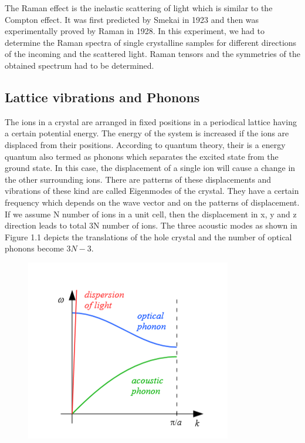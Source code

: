 \documentclass[openany,11pt,a4paper]{report}
\begin{document}
The Raman effect is the inelastic scattering of light which is similar to the Compton effect. It was first predicted by Smekai in 1923 and then was experimentally proved by Raman in 1928. In this experiment, we had to determine the Raman spectra of single crystalline samples for different directions of the incoming and the scattered light. Raman tensors and the symmetries of the obtained spectrum had to be determined. \cite{bib1}

\subsection*{Lattice vibrations and Phonons}

The ions in a crystal are arranged in  fixed positions in a periodical lattice having a certain potential energy. The energy of the system is increased if the ions are displaced from their positions. According to quantum theory, their is a energy quantum also termed as phonons which separates the excited state from the ground state.  In this case, the displacement of a single ion will cause a change in the other surrounding ions. There are patterns of these displacements and vibrations of these kind are called Eigenmodes of the crystal. They have a certain frequency which depends on the wave vector and on the patterns of displacement.
If we assume N number of ions in a unit cell, then the displacement in x, y and z direction leads to total 3N number of ions. The three acoustic modes as shown in Figure 1.1 depicts the translations of the hole crystal and the number of optical phonons become $3N-3$. \cite{bib1}




\begin{figure}[H]
\centering
\includegraphics[scale=1]{fig2.PNG}   
\caption{\cite{bib1}}
\end{figure}
\end{document}
